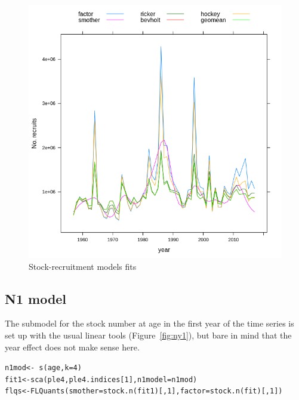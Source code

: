 \documentclass[a4paper,english,10pt]{article}\usepackage[]{graphicx}\usepackage[]{color}
\makeatletter
\newcommand{\hlnum}[1]{\textcolor[rgb]{0.063,0.58,0.627}{#1}}%
\newcommand{\hlopt}[1]{\textcolor[rgb]{0.196,0.196,0.196}{#1}}%
\newcommand{\hlstd}[1]{\textcolor[rgb]{0.196,0.196,0.196}{#1}}%
\newcommand{\hlkwb}[1]{\textcolor[rgb]{0.627,0,0.314}{#1}}%
\newcommand{\hlkwc}[1]{\textcolor[rgb]{0,0.631,0.314}{#1}}%
\newcommand{\hlkwd}[1]{\textcolor[rgb]{0.78,0.227,0.412}{#1}}%
\newenvironment{kframe}{%
 \def\at@end@of@kframe{}%
 \ifinner\ifhmode%
  \def\at@end@of@kframe{\end{minipage}}%
  \begin{minipage}{\columnwidth}%
 \fi\fi%
 \def\FrameCommand##1{\hskip\@totalleftmargin \hskip-\fboxsep
 \colorbox{shadecolor}{##1}\hskip-\fboxsep
     \hskip-\linewidth \hskip-\@totalleftmargin \hskip\columnwidth}%
 \MakeFramed {\advance\hsize-\width
   \@totalleftmargin\z@ \linewidth\hsize
   \@setminipage}}%
 {\par\unskip\endMakeFramed%
 \at@end@of@kframe}
\newenvironment{knitrout}{}{} %
\makeatother
\begin{document}
\begin{knitrout}
\color{fgcolor}\begin{figure}[H]

{\centering \includegraphics[width=.9\linewidth]{figure/srmod-1} 

}

\caption[Stock-recruitment models fits]{Stock-recruitment models fits}\label{fig:srmod}
\end{figure}


\end{knitrout}


\subsection{N1 model}

The submodel for the stock number at age in the first year of the time series is set up with the usual linear tools (Figure~\ref{fig:ny1}), but bare in mind that the year effect does not make sense here.

\begin{knitrout}
\color{fgcolor}\begin{kframe}
\begin{alltt}
\hlstd{n1mod} \hlkwb{<-} \hlopt{~}\hlkwd{s}\hlstd{(age,} \hlkwc{k} \hlstd{=} \hlnum{4}\hlstd{)}
\hlstd{fit1} \hlkwb{<-} \hlkwd{sca}\hlstd{(ple4, ple4.indices[}\hlnum{1}\hlstd{],} \hlkwc{n1model} \hlstd{= n1mod)}
\hlstd{flqs} \hlkwb{<-} \hlkwd{FLQuants}\hlstd{(}\hlkwc{smother} \hlstd{=} \hlkwd{stock.n}\hlstd{(fit1)[,} \hlnum{1}\hlstd{],} \hlkwc{factor} \hlstd{=} \hlkwd{stock.n}\hlstd{(fit)[,} \hlnum{1}\hlstd{])}
\end{alltt}
\end{kframe}
\end{knitrout}
\end{document}
